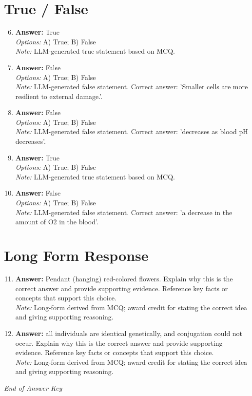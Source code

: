 \documentclass[12pt]{article}
\begin{document}
\section*{True / False}
\begin{enumerate}[label=\arabic*.]
\setcounter{enumi}{5}
\item \textbf{Answer:} True
\\ \textit{Options:} A) True; B) False
\\ \textit{Note:} LLM-generated true statement based on MCQ.
\item \textbf{Answer:} False
\\ \textit{Options:} A) True; B) False
\\ \textit{Note:} LLM-generated false statement. Correct answer: 'Smaller cells are more resilient to external damage.'.
\item \textbf{Answer:} False
\\ \textit{Options:} A) True; B) False
\\ \textit{Note:} LLM-generated false statement. Correct answer: 'decreases as blood pH decreases'.
\item \textbf{Answer:} True
\\ \textit{Options:} A) True; B) False
\\ \textit{Note:} LLM-generated true statement based on MCQ.
\item \textbf{Answer:} False
\\ \textit{Options:} A) True; B) False
\\ \textit{Note:} LLM-generated false statement. Correct answer: 'a decrease in the amount of O2 in the blood'.
\end{enumerate}

\section*{Long Form Response}
\begin{enumerate}[label=\arabic*.]
\setcounter{enumi}{10}
\item \textbf{Answer:} Pendant (hanging) red-colored flowers. Explain why this is the correct answer and provide
supporting evidence. Reference key facts or concepts that support this choice.
\\ \textit{Note:} Long-form derived from MCQ; award credit for stating the correct idea and giving supporting reasoning.
\item \textbf{Answer:} all individuals are identical genetically, and conjugation could not occur. Explain why
this is the correct answer and provide supporting evidence. Reference key facts or
concepts that support this choice.
\\ \textit{Note:} Long-form derived from MCQ; award credit for stating the correct idea and giving supporting reasoning.
\end{enumerate}

\vfill
\noindent\textit{End of Answer Key}
\end{document}
